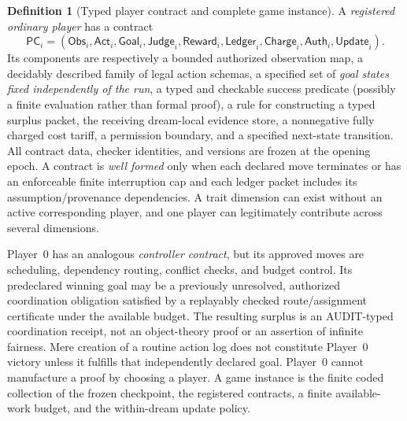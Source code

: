\documentclass[11pt,letterpaper]{article}
\theoremstyle{definition}
\newtheorem{definition}{Definition}[section]
\theoremstyle{plain}
\theoremstyle{definition}
\begin{document}
\begin{definition}[Typed player contract and complete game instance]
A \emph{registered ordinary player} has a contract
\[
 \mathsf{PC}_i=(\mathsf{Obs}_i,\mathsf{Act}_i,\mathsf{Goal}_i,
 \mathsf{Judge}_i,\mathsf{Reward}_i,\mathsf{Ledger}_i,
 \mathsf{Charge}_i,\mathsf{Auth}_i,\mathsf{Update}_i).
\]
Its components are respectively a bounded authorized observation map, a decidably described family of legal action schemas, a specified set of \emph{goal states fixed independently of the run}, a typed and checkable success predicate (possibly a finite evaluation rather than formal proof), a rule for constructing a typed surplus packet, the receiving dream-local evidence store, a nonnegative fully charged cost tariff, a permission boundary, and a specified next-state transition. All contract data, checker identities, and versions are frozen at the opening epoch. A contract is \emph{well formed} only when each declared move terminates or has an enforceable finite interruption cap and each ledger packet includes its assumption/provenance dependencies. A trait dimension can exist without an active corresponding player, and one player can legitimately contribute across several dimensions.

Player~0 has an analogous \emph{controller contract}, but its approved moves are scheduling, dependency routing, conflict checks, and budget control. Its predeclared winning goal may be a previously unresolved, authorized coordination obligation satisfied by a replayably checked route/assignment certificate under the available budget. The resulting surplus is an \textsf{AUDIT}-typed coordination receipt, not an object-theory proof or an assertion of infinite fairness. Mere creation of a routine action log does not constitute Player~0 victory unless it fulfills that independently declared goal. Player~0 cannot manufacture a proof by choosing a player. A game instance is the finite coded collection of the frozen checkpoint, the registered contracts, a finite available-work budget, and the within-dream update policy.
\end{definition}
\end{document}
